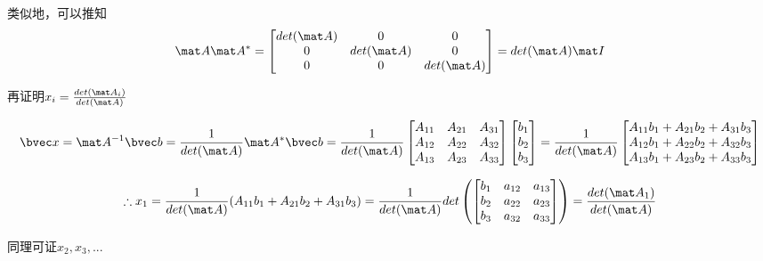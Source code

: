 类似地，可以推知
\begin{equation}
\mat A \mat A^* =
\begin{bmatrix}
det(\mat A)&0&0\\
0&det(\mat A)&0\\
0&0&det(\mat A)\\
\end{bmatrix}
=det(\mat A) \mat I
\end{equation}

再证明$x_i=\frac{det(\mat A_i)}{det(\mat A)}$

$$
\bvec x = \mat A^{-1} \bvec b = \frac{1}{det(\mat A)}\mat A^* \bvec b = 
\frac{1}{det(\mat A)}
\begin{bmatrix}
A_{11}&A_{21}&A_{31}\\
A_{12}&A_{22}&A_{32}\\
A_{13}&A_{23}&A_{33}\\
\end{bmatrix}
\begin{bmatrix}
b_1\\
b_2\\
b_3\\
\end{bmatrix}
=
\frac{1}{det(\mat A)}
\begin{bmatrix}
A_{11}b_1+A_{21}b_2+A_{31}b_3\\
A_{12}b_1+A_{22}b_2+A_{32}b_3\\
A_{13}b_1+A_{23}b_2+A_{33}b_3\\
\end{bmatrix}
$$

$$
\therefore x_1=\frac{1}{det(\mat A)}(A_{11}b_1+A_{21}b_2+A_{31}b_3)
=\frac{1}{det(\mat A)}det\left(
\begin{bmatrix}
b_{1}&a_{12}&a_{13}\\
b_{2}&a_{22}&a_{23}\\
b_{3}&a_{32}&a_{33}\\
\end{bmatrix}
\right)
=\frac{det(\mat A_1)}{det(\mat A)}
$$

同理可证$x_2, x_3,...$
